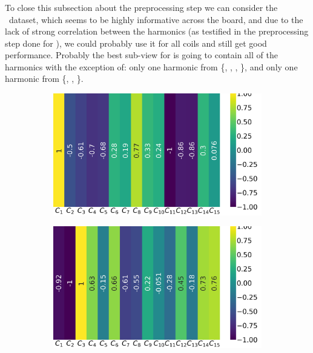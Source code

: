 \subsubsection{\phin}
To close this subsection about the preprocessing step we can consider the \phin\ dataset, which
seems to be highly informative across the board, and due to the lack of strong correlation between
the harmonics (as testified in the preprocessing step done for \qrp), we could probably use it for
all coils and still get good performance. Probably the best sub-view for \phin is going to contain
all of the harmonics with the exception of: only one harmonic from \{\phin[2], \phin[6], \phin[10],
\phin[14]\}, and only one harmonic from \{\phin[4], \phin[8], \phin[12]\}.

\begin{figure}[!h]
	\centering
	\begin{subfigure}{0.49\linewidth}
		\includegraphics[width=\linewidth]{img/qlp_corr/Phi_coil0.png}
	\end{subfigure}
	\begin{subfigure}{0.49\linewidth}
		\includegraphics[width=\linewidth]{img/qlp_corr/Phi_coil1.png}

\end{subfigure}
\end{figure}
